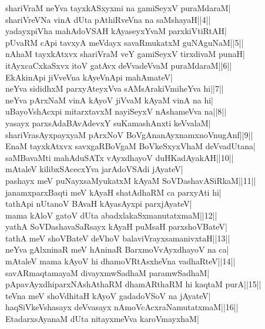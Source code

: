 \documentclass{article}
\begin{document}
shariVraM neYva tayxkASxyxmi na gamiSeyxV puraMdaraM|\\
shariVreVNa vinA dUta pAthiRveVna na saMshayaH||4||\\
yadayxpiVha mahAdoVSAH kAyaseyxYvaM parxkiVtiRtAH|\\
pUvaRM cApi tavxyA meVdayx savaRmukatxM guNAguNaM||5||\\
nAhaM tayxkAtxvx shariVraM veY gamiSeyxV tirxdivaM punaH|\\
itAyxcaCxkaSxvx itoV gatAvx deVvadeVvaM puraMdaraM||6||\\
EkAkinApi jiVveVna kAyeVnApi mahAmateV|\\
neYva sididhxM parxyAteyxVva sAMsArakiVmiheYva hi||7||\\
neYva pArxNaM vinA kAyoV jiVvaM kAyaM vinA na hi|\\
uBayoVshAcxpi mitarxtavxM nayiSeyxV nAshameVva na||8||\\
yasayx parxsAdaBAvAdevxY suKamashAnxti keVvalaM|\\
shariVrasAyxpayxyaM pArxNoV BoVgAnanAyxnamxnoVnugAnf||9||\\
EnaM tayxkAtxvx savxgaRBoVgaM BoVkeSxyxVhaM deVvadUtana|\\
saMBavaMti mahAduSATx vAyxdhayoV duHKadAyakAH||10||\\
mAtaleV kilibxSAcecxYva jarAdoVSAdi jAyateV|\\
pashayx meV puNayxsaMyukatxM kAyaM SoVDashavASiRkaM||11||\\
janamxparxBaqti meV kAyaH shatAdhaRM ca parxyAti hi|\\
tathApi nUtanoV BAvaH kAyasAyxpi parxjAyateV|\\
mama kAloV gatoV dUta abadxlakaSxmanutatxmaM||12||\\
yathA SoVDashavaSaRsayx kAyaH puMsaH parxshoVBateV|\\
tathA meV shoVBateV deVhoV balaviVrayxsamanivxtaH||13||\\
neYva gAlxninaR meV hAninaR BarxmoVvAyxdhayoV na ca|\\
mAtaleV mama kAyoV hi dhamoVRtAsxheVna vadhaRteV||14||\\
savARmaqtamayaM divayxmwSadhaM paramwSadhaM|\\
pApavAyxdhiparxNAshAthaRM dhamARthaRM hi kaqtaM purA||15||\\
teVna meV shoVdhitaH kAyoV gadadoVSoV na jAyateV|\\
haqSiVkeVshasayx deVvasayx nAmoVcAcxraNamutatxmaM||16||\\
EtadarxsAyanaM dUta nitayxmeVva karoVmayxhaM|\\
\end{document}
